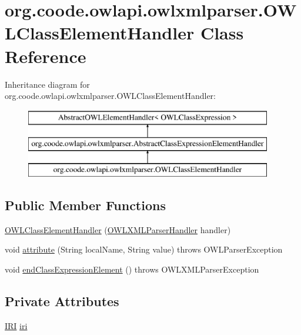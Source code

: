 \hypertarget{classorg_1_1coode_1_1owlapi_1_1owlxmlparser_1_1_o_w_l_class_element_handler}{\section{org.\-coode.\-owlapi.\-owlxmlparser.\-O\-W\-L\-Class\-Element\-Handler Class Reference}
\label{classorg_1_1coode_1_1owlapi_1_1owlxmlparser_1_1_o_w_l_class_element_handler}
}
Inheritance diagram for org.\-coode.\-owlapi.\-owlxmlparser.\-O\-W\-L\-Class\-Element\-Handler\-:\begin{figure}[H]
\begin{center}
\leavevmode
\includegraphics[height=3.000000cm]{classorg_1_1coode_1_1owlapi_1_1owlxmlparser_1_1_o_w_l_class_element_handler}
\end{center}
\end{figure}
\subsection*{Public Member Functions}
\begin{DoxyCompactItemize}
\item 
\hyperlink{classorg_1_1coode_1_1owlapi_1_1owlxmlparser_1_1_o_w_l_class_element_handler_afbca50919d28b200041851e8c376ceac}{O\-W\-L\-Class\-Element\-Handler} (\hyperlink{classorg_1_1coode_1_1owlapi_1_1owlxmlparser_1_1_o_w_l_x_m_l_parser_handler}{O\-W\-L\-X\-M\-L\-Parser\-Handler} handler)
\item 
void \hyperlink{classorg_1_1coode_1_1owlapi_1_1owlxmlparser_1_1_o_w_l_class_element_handler_a3c20bddabbf3492e1b0ef0147f18d5b8}{attribute} (String local\-Name, String value)  throws O\-W\-L\-Parser\-Exception 
\item 
void \hyperlink{classorg_1_1coode_1_1owlapi_1_1owlxmlparser_1_1_o_w_l_class_element_handler_a2d51a5e527288cee52661f02aa8b877d}{end\-Class\-Expression\-Element} ()  throws O\-W\-L\-X\-M\-L\-Parser\-Exception 
\end{DoxyCompactItemize}
\subsection*{Private Attributes}
\begin{DoxyCompactItemize}
\item 
\hyperlink{classorg_1_1semanticweb_1_1owlapi_1_1model_1_1_i_r_i}{I\-R\-I} \hyperlink{classorg_1_1coode_1_1owlapi_1_1owlxmlparser_1_1_o_w_l_class_element_handler_a3c1521da2b0fb040aed56499e521bc98}{iri}
\end{DoxyCompactItemize}

